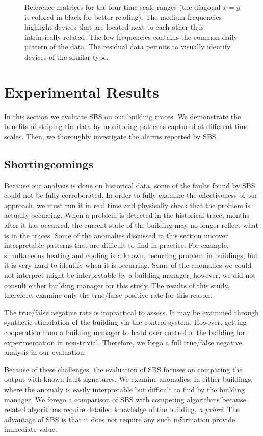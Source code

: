 \begin{figure}[t!]
\caption{Reference matrices for the four time scale ranges (the diagonal $x=y$ is colored in black for better reading). The medium frequencies highlight devices that are located next to each other thus intrinsically related. The low frequencies contains the common daily pattern of the data. The residual data permits to visually identify devices of the similar type.}
\label{fig:heatmap}
\end{figure}

\section{Experimental Results}
\label{eval}
In this section we evaluate SBS on our building traces.  We demonstrate
 the benefits of striping the data by monitoring patterns captured at different time scales.
Then, we thoroughly investigate the alarms reported by SBS.  

\subsection{Shortingcomings}
Because our analysis is done on historical data, some of the faults found by SBS could not be fully
corroborated.  In order to fully examine the effectiveness of our approach, we must run it in real time and
physically check that the problem is actually occurring.  When a problem is detected
in the historical trace, months after it has occurred, the current state of the building may no longer reflect
what is in the traces.  Some of the anomalies discussed in this section uncover interpretable patterns 
that are difficult to find in practice.  For example, simultaneous heating and cooling is a known, recurring problem
 in buildings, but it is very hard to identify  when it is occurring.  Some of the anomalies we could not interpret
might be interpretable by a building manager, however, we did not consult either building manager for this study.
The results of this study, therefore, examine only the true/false positive rate for this reason.

The true/false negative rate is impractical to assess.  It may be examined through synthetic stimulation of
the building via the control system.  However, getting cooperation from a building manager to hand over control of the building
for experimentation in non-trivial.  Therefore, we forgo a full true/false negative analysis in our evaluation.

Because of these challenges, the evaluation of SBS focuses on comparing the output with known fault
signatures.  We examine anomalies, in either buildings, where the anomaly is easily interpretable but
difficult to find by the building manager.  We forego a comparison of SBS with competing algorithms because
 related algorithms require detailed knowledge of the building, \emph{a priori}.  The advantage of SBS is that it 
 does not require any such information provide immediate value.

